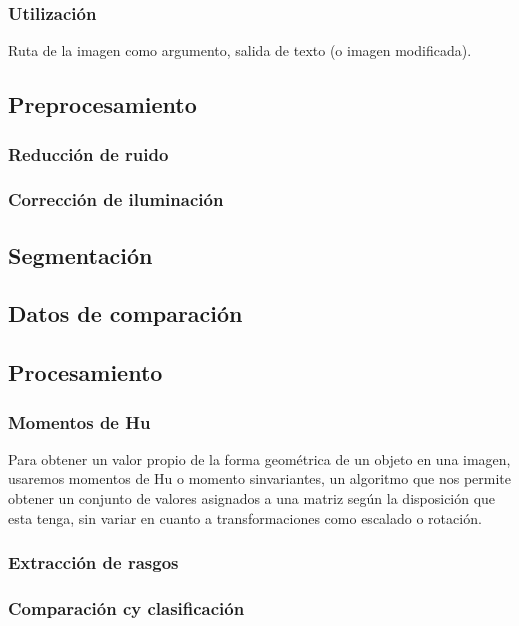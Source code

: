 \documentclass[letter]{article}
\begin{document}
\subsubsection{Utilización}
\label{sec:org29611a0}
Ruta de la imagen como argumento, salida de texto (o imagen modificada).

\subsection{Preprocesamiento}
\label{sec:org037b8dd}

\subsubsection{Reducción de ruido}
\label{sec:org411ba4b}
\subsubsection{Corrección de iluminación}
\label{sec:orgaccad57}

\subsection{Segmentación}
\label{sec:orga2fde70}

\subsection{Datos de comparación}
\label{sec:org56fe840}

\subsection{Procesamiento}
\label{sec:org2156455}
\subsubsection{Momentos de Hu}
\label{sec:org13e647c}
Para obtener un valor propio de la forma geométrica de un objeto en una imagen,
usaremos momentos de Hu o momento sinvariantes, un algoritmo que nos permite
obtener un conjunto de valores asignados a una matriz según la disposición que
esta tenga, sin variar en cuanto a transformaciones como escalado o rotación.

\subsubsection{Extracción de rasgos}
\label{sec:orge9a528d}
\subsubsection{Comparación cy clasificación}
\label{sec:orgb620e19}
\end{document}
